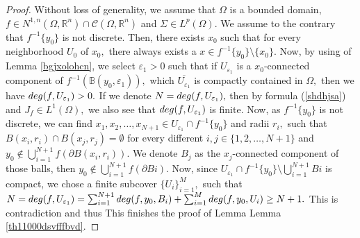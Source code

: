 \documentclass[10pt,a4paper]{amsart}
\begin{document}
\begin{proof}
Without loss of generality, we assume that $\Omega$ is a bounded domain, $f\in N^{1,n}(\Omega,\mathbb{R}^{n})\cap \mathcal{C}(\Omega,\mathbb{R}^{n})$ and $\Sigma\in L^{p}(\Omega).$
We assume to the contrary that  $f^{-1}\{y_{0}\}$ is not discrete. Then, there exists $x_{0}$ such that for every neighborhood $U_{0}$ of $x_{0},$ there always exists a $x\in f^{-1}\{y_{0}\}\setminus\{x_{0}\}.$
Now, by using of Lemma \ref{bgjxolohcn}, we select $\varepsilon_{1}>0$ such that if  $U_{\varepsilon_{1}}$ is a $x_{0}$-connected component of $f^{-1}(\mathbb{B}(y_{0},\varepsilon_{1})),$ which $\overline{U_{\varepsilon_{1}}}$ is compactly contained in $\Omega,$ then we have ${\rm deg}(f,U_{\varepsilon_{1}})>0.$  If we denote $N={\rm deg}(f,U_{\varepsilon_{1}}),$ then by formula (\ref{shdhjsa})
and  $J_{f}\in L^{1}(\Omega),$ we also see that ${\rm deg}(f,U_{\varepsilon_{1}})$ is finite. Now,  as  $f^{-1}\{y_{0}\}$ is not discrete,  we can find $x_{1},x_{2},\ldots,x_{N+1}\in U_{\varepsilon_{1}}\cap f^{-1}\{y_{0}\}$ and radii $r_{i},$ such that $B(x_{i},r_{i})\cap B(x_{j},r_{j})=\emptyset$ for every different $i,j\in\{1,2,\ldots,N+1\}$ and $y_{0}\notin\bigcup_{i=1}^{N+1}f(\partial B(x_{i},r_{i})).$
We denote $B_{j}$ as the $x_{j}$-connected component of those balls, then $y_{0}\notin\bigcup_{i=1}^{N+1}f(\partial B{i}).$ Now, since $U_{\varepsilon_{1}}\cap f^{-1}\{y_{0}\}\setminus\bigcup_{i=1}^{N+1}B{i}$
is compact, we chose a finite subcover $\{U_{i}\}_{i=1}^{M},$
such that $N={\rm deg}(f,U_{\varepsilon_{1}})=\sum_{i=1}^{N+1}{\rm deg}(f,y_{0},B_{i})+\sum_{i=1}^{M}{\rm deg}(f,y_{0},U_{i})\geq N+1.$ This is contradiction and thus This finishes the proof of Lemma
Lemma \ref{th11000dsvfffbvd}.
\end{proof}
\end{document}
